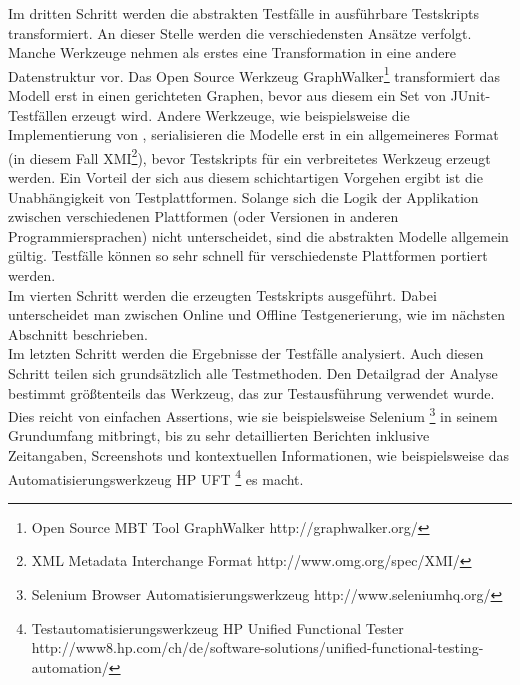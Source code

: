 Im dritten Schritt werden die abstrakten Testfälle in ausführbare Testskripts transformiert. An dieser Stelle werden die verschiedensten Ansätze verfolgt. Manche Werkzeuge nehmen als erstes eine Transformation in eine andere Datenstruktur vor. Das Open Source Werkzeug GraphWalker\footnote{Open Source \Gls{MBT} Tool GraphWalker http://graphwalker.org/} transformiert das Modell erst in einen gerichteten Graphen, bevor aus diesem ein Set von JUnit-Testfällen erzeugt wird. Andere Werkzeuge, wie beispielsweise die Implementierung von \citeauthor{pinheiro_model-based_2013} \cite{pinheiro_model-based_2013}, serialisieren die Modelle erst in ein allgemeineres Format (in diesem Fall XMI\footnote{XML Metadata Interchange Format http://www.omg.org/spec/XMI/}), bevor Testskripts für ein verbreitetes Werkzeug erzeugt werden. Ein Vorteil der sich aus diesem schichtartigen Vorgehen ergibt ist die Unabhängigkeit von Testplattformen. Solange sich die Logik der Applikation zwischen verschiedenen Plattformen (oder Versionen in anderen Programmiersprachen) nicht unterscheidet, sind die abstrakten Modelle allgemein gültig. Testfälle können so sehr schnell für verschiedenste Plattformen portiert werden.\\
Im vierten Schritt werden die erzeugten Testskripts ausgeführt. Dabei unterscheidet man zwischen Online und Offline Testgenerierung, wie im nächsten Abschnitt beschrieben.\\
Im letzten Schritt werden die Ergebnisse der Testfälle analysiert. Auch diesen Schritt teilen sich grundsätzlich alle Testmethoden. Den Detailgrad der Analyse bestimmt größtenteils das Werkzeug, das zur Testausführung verwendet wurde. Dies reicht von einfachen Assertions, wie sie beispielsweise Selenium \footnote{Selenium Browser Automatisierungswerkzeug http://www.seleniumhq.org/} in seinem Grundumfang mitbringt, bis zu sehr detaillierten Berichten inklusive Zeitangaben, Screenshots und kontextuellen Informationen, wie beispielsweise das Automatisierungswerkzeug HP UFT \footnote{Testautomatisierungswerkzeug HP Unified Functional Tester http://www8.hp.com/ch/de/software-solutions/unified-functional-testing-automation/} es macht.

